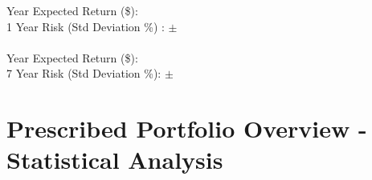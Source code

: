 \documentclass{article}
\begin{document}
 Year Expected Return (\$): {} \quad \emph{{}} \\
1 Year Risk (Std Deviation \%) : $\pm$ {}
\\ \\
 Year Expected Return (\$): {} \quad \emph{{}} \\
7 Year Risk (Std Deviation \%): $\pm$ {}


\newpage    %


\section{Prescribed Portfolio Overview - Statistical Analysis}

\vspace{1.5cm}

\end{document}
